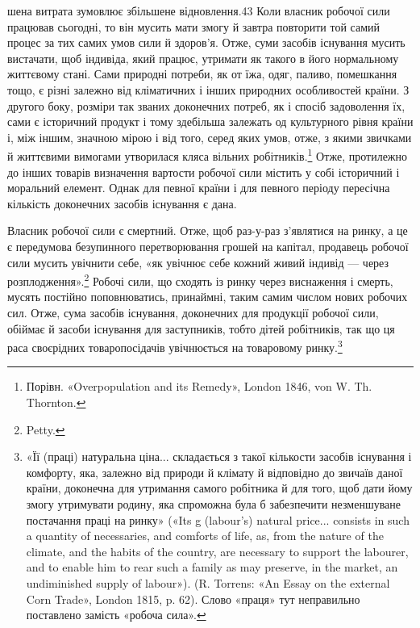 \parcont{}  %
шена витрата зумовлює збільшене відновлення.43 Коли власник
робочої сили працював сьогодні, то він мусить мати змогу й завтра
повторити той самий процес за тих самих умов сили й здоров’я.
Отже, суми засобів існування мусить вистачати, щоб індивіда,
який працює, утримати як такого в його нормальному життєвому
стані. Сами природні потреби, як от їжа, одяг, паливо, помешкання
тощо, є різні залежно від кліматичних і інших природних
особливостей країни. З другого боку, розміри так званих доконечних
потреб, як і спосіб задоволення їх, сами є історичний
продукт і тому здебільша залежать од культурного рівня країни
і, між іншим, значною мірою і від того, серед яких умов, отже,
з якими звичками й життєвими вимогами утворилася кляса вільних
робітників.\footnote{
Порівн. «Overpopulation and its Remedy», London 1846, von W. Th.
Thornton.
} Отже, протилежно до інших товарів визначення
вартости робочої сили містить у собі історичний і моральний
елемент. Однак для певної країни і для певного періоду пересічна
кількість доконечних засобів існування є дана.

Власник робочої сили є смертний. Отже, щоб раз-у-раз
з’являтися на ринку, а це є передумова безупинного перетворювання
грошей на капітал, продавець робочої сили мусить увічнити
себе, «як увічнює себе кожний живий індивід — через
розплодження».\footnote{
Petty.
} Робочі сили, що сходять із ринку через виснаження
і смерть, мусять постійно поповнюватись, принаймні,
таким самим числом нових робочих сил. Отже, сума засобів
існування, доконечних для продукції робочої сили, обіймає й
засоби існування для заступників, тобто дітей робітників, так
що ця раса своєрідних товаропосідачів увічнюється на товаровому
ринку.\footnote{
«Її (праці) натуральна ціна... складається з такої кількости засобів
існування і комфорту, яка, залежно від природи й клімату й відповідно
до звичаїв даної країни, доконечна для утримання самого робітника
й для того, щоб дати йому змогу утримувати родину, яка спроможна
була б забезпечити незменшуване постачання праці на ринку» («Its
g (labour’s) natural price... consists in such a quantity of necessaries, and
comforts of life, as, from the nature of the climate, and the habits of the
country, are necessary to support the labourer, and to enable him to rear
such a family as may preserve, in the market, an undiminished supply of
labour»). (R. Torrens: «An Essay on the external Corn Trade», London
1815, p. 62). Слово «праця» тут неправильно поставлено замість «робоча
сила».
}

